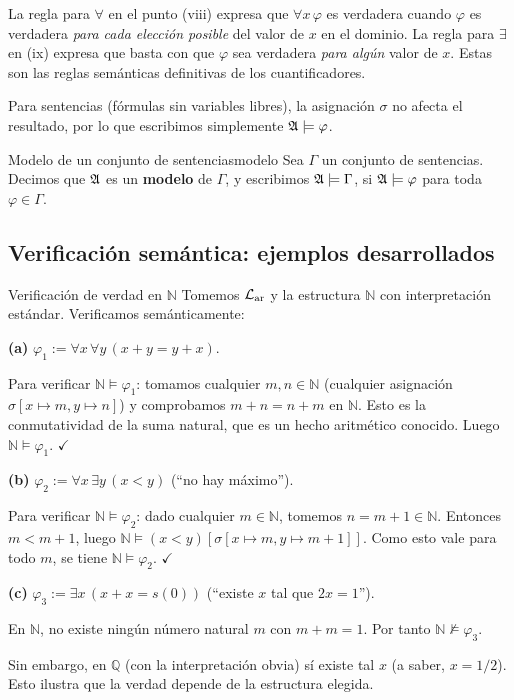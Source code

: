 \begin{importante}
La regla para $\forall$ en el punto (viii) expresa que $\forall x\, \varphi$ es verdadera cuando $\varphi$ es verdadera \emph{para cada elección posible} del valor de $x$ en el dominio. La regla para $\exists$ en (ix) expresa que basta con que $\varphi$ sea verdadera \emph{para algún} valor de $x$. Estas son las reglas semánticas definitivas de los cuantificadores.
\end{importante}

Para sentencias (fórmulas sin variables libres), la asignación $\sigma$ no afecta el resultado, por lo que escribimos simplemente $\mathfrak{A} \models \varphi$.

\begin{definicion}{Modelo de un conjunto de sentencias}{modelo}
Sea $\Gamma$ un conjunto de sentencias. Decimos que $\mathfrak{A}$ es un \textbf{modelo} de $\Gamma$, y escribimos $\mathfrak{A} \models \Gamma$, si $\mathfrak{A} \models \varphi$ para toda $\varphi \in \Gamma$.
\end{definicion}

\subsection{Verificación semántica: ejemplos desarrollados}

\begin{ejemplo}{Verificación de verdad en $\mathbb{N}$}{}
Tomemos $\mathcal{L}_{\mathrm{ar}}$ y la estructura $\mathbb{N}$ con interpretación estándar. Verificamos semánticamente:

\medskip
\textbf{(a)} $\varphi_1 := \forall x\, \forall y\, (x + y = y + x)$.

Para verificar $\mathbb{N} \models \varphi_1$: tomamos cualquier $m, n \in \mathbb{N}$ (cualquier asignación $\sigma[x \mapsto m, y \mapsto n]$) y comprobamos $m + n = n + m$ en $\mathbb{N}$. Esto es la conmutatividad de la suma natural, que es un hecho aritmético conocido. Luego $\mathbb{N} \models \varphi_1$. $\checkmark$

\medskip
\textbf{(b)} $\varphi_2 := \forall x\, \exists y\, (x < y)$ (``no hay máximo'').

Para verificar $\mathbb{N} \models \varphi_2$: dado cualquier $m \in \mathbb{N}$, tomemos $n = m + 1 \in \mathbb{N}$. Entonces $m < m+1$, luego $\mathbb{N} \models (x < y)[\sigma[x\mapsto m, y \mapsto m+1]]$. Como esto vale para todo $m$, se tiene $\mathbb{N} \models \varphi_2$. $\checkmark$

\medskip
\textbf{(c)} $\varphi_3 := \exists x\, (x + x = s(0))$ (``existe $x$ tal que $2x = 1$'').

En $\mathbb{N}$, no existe ningún número natural $m$ con $m + m = 1$. Por tanto $\mathbb{N} \not\models \varphi_3$.

Sin embargo, en $\mathbb{Q}$ (con la interpretación obvia) sí existe tal $x$ (a saber, $x = 1/2$). Esto ilustra que la verdad depende de la estructura elegida.
\end{ejemplo}


